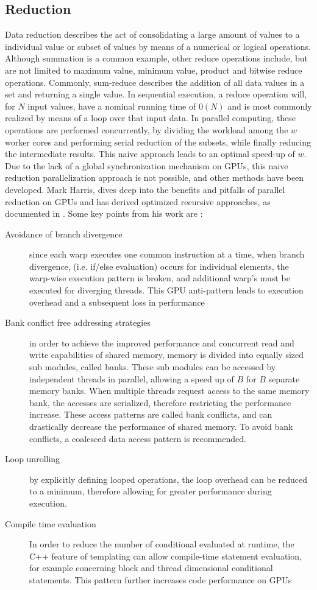 \subsection{Reduction}\label{ssec:reduction}
Data reduction describes the act of consolidating a large amount of values to
a individual value or subset of values by means of a numerical or logical operations.
Although summation is a common example, other reduce operations include,
but are not limited to maximum value, minimum value, product and bitwise reduce operations.
  Commonly,
sum-reduce describes the addition of all data values in a set and returning a single value.
In sequential execution, a reduce operation will, for $N$ input values, have a nominal
running time of $0(N)$ and is most commonly realized by means of a loop over that
input data.  In parallel computing, these operations are performed concurrently, by dividing the
workload among the $w$ worker cores and performing serial reduction of the subsets,
while finally reducing the intermediate results.  This naive approach leads to an
optimal \gls{speed-up} of $w$.  Due to the lack of a global synchronization mechanism
on \Glspl{GPU}, this naive reduction parallelization approach is not possible,
and other methods have been developed.  Mark Harris, dives deep into the benefits
and pitfalls of parallel reduction on \Glspl{GPU} and has derived optimized
recursive approaches, as documented in \cite{harris}.  Some key points from his work are
:
\begin{description}
  \item [Avoidance of branch divergence]
since each warp executes one common instruction at a time, when branch divergence,
(i.e. if/else evaluation) occurs for individual elements, the warp-wise execution pattern
is broken, and additional warp's must be executed for diverging threads. This \Gls{GPU} anti-pattern
leads to execution overhead and a subsequent loss in performance
  \item [Bank conflict free addressing strategies]
  in order to achieve the improved performance and concurrent read and write capabilities
  of shared memory, memory is divided into equally sized sub modules, called banks.
  These sub modules can be accessed by independent threads in parallel, allowing a speed up
  of $B$ for $B$ separate memory banks.  When multiple threads request access to
  the same memory bank, the accesses are serialized, therefore restricting the performance increase.
  These access patterns are called bank conflicts, and can drastically decrease
  the performance of shared memory.  To avoid bank conflicts, a coalesced data
  access pattern is recommended.
  \item [Loop unrolling] by explicitly defining looped operations, the loop overhead
  can be reduced to a minimum, therefore allowing for greater performance during execution.
  \item [Compile time evaluation]  In order to reduce the number of conditional
  evaluated at runtime, the C++ feature of templating can allow compile-time statement
  evaluation, for example concerning block and thread dimensional conditional statements.
  This pattern further increases code performance on \Glspl{GPU}
\end{description}

